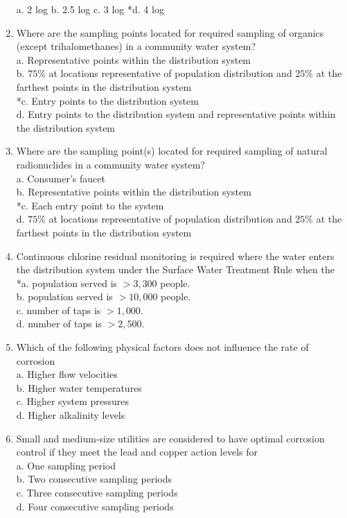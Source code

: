\begin{enumerate}[1.]
a. 2 log
b. 2.5 log
c. 3 log
*d. 4 log
\item Where are the sampling points located for required sampling of organics (except trihalomethanes) in a community water system?\\
a. Representative points within the distribution system\\
b. $75 \%$ at locations representative of population distribution and $25 \%$ at the farthest points in the distribution system\\
*c. Entry points to the distribution system\\
d. Entry points to the distribution system and representative points within the distribution system
\item Where are the sampling point(s) located for required sampling of natural radionuclides in a community water system?\\
a. Consumer's faucet\\
b. Representative points within the distribution system\\
*c. Each entry point to the system\\
d. $75 \%$ at locations representative of population distribution and $25 \%$ at the farthest points in the distribution system\\
\item Continuous chlorine residual monitoring is required where the water enters the distribution system under the Surface Water Treatment Rule when the\\
*a. population served is $>3,300$ people.\\
b. population served is $>10,000$ people.\\
c. number of taps is $>1,000$.\\
d. number of taps is $>2,500$.\\
\item Which of the following physical factors does not influence the rate of corrosion\\
a.	Higher flow velocities\\
b.	Higher water temperatures\\
c.	Higher system pressures\\
d.	Higher alkalinity levels\\
\item Small and medium-size utilities are considered to have optimal corrosion control if they meet the lead and copper action levels for\\
a.	One sampling period\\
b.	Two consecutive sampling periods\\
c.	Three consecutive sampling periods\\
d.	Four consecutive sampling periods\\



\end{enumerate}
